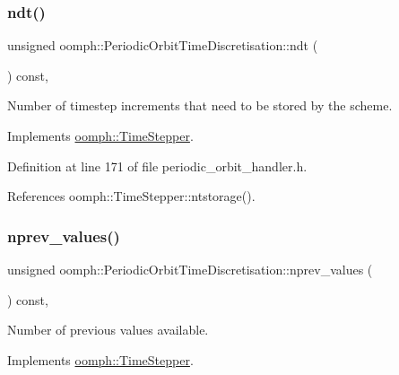 \subsubsection{\texorpdfstring{ndt()}{ndt()}}
{\footnotesize\ttfamily unsigned oomph\+::\+Periodic\+Orbit\+Time\+Discretisation\+::ndt (\begin{DoxyParamCaption}{ }\end{DoxyParamCaption}) const\hspace{0.3cm}{\ttfamily [inline]}, {\ttfamily [virtual]}}



Number of timestep increments that need to be stored by the scheme. 



Implements \hyperlink{classoomph_1_1TimeStepper_a00e57b6436cff4fc82af481b81a78a1a}{oomph\+::\+Time\+Stepper}.



Definition at line 171 of file periodic\+\_\+orbit\+\_\+handler.\+h.



References oomph\+::\+Time\+Stepper\+::ntstorage().

\mbox{\label{classoomph_1_1PeriodicOrbitTimeDiscretisation_aff80f0af851d19d3b19cfee5d17022f3}} 
\subsubsection{\texorpdfstring{nprev\+\_\+values()}{nprev\_values()}}
{\footnotesize\ttfamily unsigned oomph\+::\+Periodic\+Orbit\+Time\+Discretisation\+::nprev\+\_\+values (\begin{DoxyParamCaption}{ }\end{DoxyParamCaption}) const\hspace{0.3cm}{\ttfamily [inline]}, {\ttfamily [virtual]}}



Number of previous values available. 



Implements \hyperlink{classoomph_1_1TimeStepper_a0f38713ed304c18d9f7b5cf8131664c1}{oomph\+::\+Time\+Stepper}.



